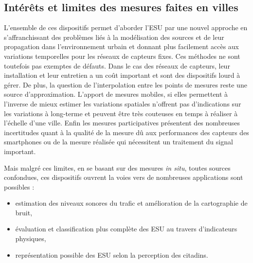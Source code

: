 \subsection{Intérêts et limites des mesures faites en villes}

L'ensemble de ces dispositifs permet d'aborder l'ESU par une nouvel approche en s'affranchissant des problèmes liés à la modélisation des sources et de leur propagation dans l'environnement urbain et donnant plus facilement accès aux variations temporelles pour les réseaux de capteurs fixes. Ces méthodes ne sont toutefois pas exemptes de défauts. 
Dans le cas des réseaux de capteurs, leur installation et leur entretien a un coût important et sont des dispositifs lourd à gérer. De plus, la question de l'interpolation entre les points de mesures reste une source d'approximation. 
L'apport de mesures mobiles, si elles permettent à l'inverse de mieux estimer les variations spatiales n'offrent pas d'indications sur les variations à long-terme et peuvent être très couteuses en temps à réaliser à l'échelle d'une ville. Enfin les mesures participatives présentent des nombreuses incertitudes quant à la qualité de la mesure dû aux performances des capteurs des smartphones ou de la mesure réalisée qui nécessitent un traitement du signal important.

Mais malgré ces limites, en se basant sur des mesures \textit{in situ}, toutes sources confondues, ces dispositifs ouvrent la voies vers de nombreuses applications sont possibles : 

\begin{itemize}
\item estimation des niveaux sonores du trafic et amélioration de la cartographie de bruit, 
\item évaluation et classification plus complète des ESU au travers d'indicateurs physiques,
\item représentation possible des ESU selon la perception des citadins.
\end{itemize}


